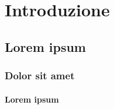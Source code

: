 \documentclass[crop=false, class=book]{standalone}
\begin{document}
	\chapter{Introduzione}
	
	\lipsum[1]
	
	
	\section{Lorem ipsum}
	\lipsum[2]
	
	\subsection{Dolor sit amet} 
	\lipsum[3]
	
	
	\subsubsection{Lorem ipsum}
	\lipsum[3]
	
	
	
\end{document}
